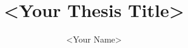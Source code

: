 \documentclass[english]{GayaUKM}
\title{<Your Thesis Title>}
\author{<Your Name>}
\begin{document}
\maketitle

\frontmatter
\declaration








\tableofcontents
\listoffigures
\listoftables




\mainmatter








\appendix


\end{document}
